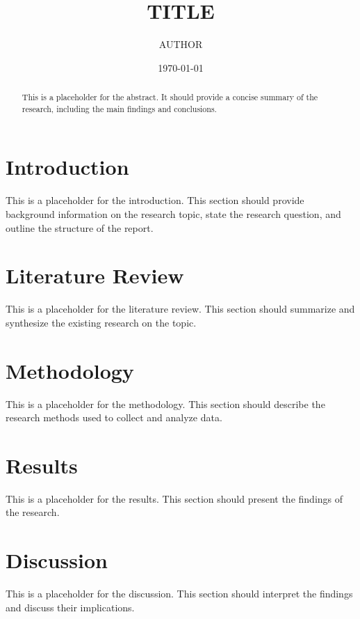 \documentclass[12pt, letterpaper]{article}
\title{\textbf{{{TITLE}}}}
\author{{{AUTHOR}}}
\date{\today}
\begin{document}
\maketitle
\thispagestyle{empty}
\tableofcontents
\newpage

\begin{abstract}
This is a placeholder for the abstract. It should provide a concise summary of the research, including the main findings and conclusions.
\end{abstract}
\newpage

\section{Introduction}
This is a placeholder for the introduction. This section should provide background information on the research topic, state the research question, and outline the structure of the report.

\section{Literature Review}
This is a placeholder for the literature review. This section should summarize and synthesize the existing research on the topic.

\section{Methodology}
This is a placeholder for the methodology. This section should describe the research methods used to collect and analyze data.

\section{Results}
This is a placeholder for the results. This section should present the findings of the research.

\section{Discussion}
This is a placeholder for the discussion. This section should interpret the findings and discuss their implications.
\end{document}
